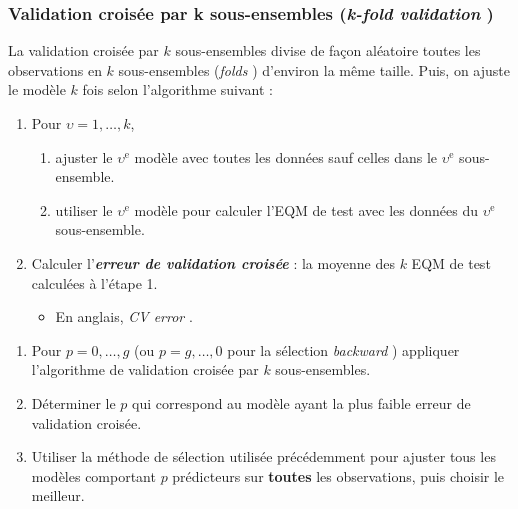 \documentclass[french]{article}
\begin{document}
\begin{multicols*}{2}
\subsubsection{Validation croisée par k sous-ensembles (\og \textit{k-fold validation} \fg{})}
\begin{algo2}
La validation croisée par $k$ sous-ensembles divise de façon aléatoire toutes les observations en $k$ sous-ensembles (\og \textit{folds} \fg{}) d'environ la même taille. Puis, on ajuste le modèle $k$ fois selon l'algorithme suivant : 
\begin{enumerate}[label = \circled{\arabic*}{trueblue}]
	\item	Pour $\upsilon = 1, \dots, k$, 
		\begin{enumerate}[label = \circled{\scriptsize{(\alph*)}}{trueblue!80!white}]
		\item	ajuster le $\upsilon^{\text{e}}$ modèle avec toutes les données sauf celles dans le $\upsilon^{\text{e}}$ sous-ensemble.
		\item	utiliser le $\upsilon^{\text{e}}$ modèle pour calculer l'EQM de test avec les données du $\upsilon^{\text{e}}$ sous-ensemble.
		\end{enumerate}
	\item	Calculer l'\textbf{\textit{erreur de validation croisée}} : la moyenne des $k$ EQM de test calculées à l'étape 1.
		\begin{itemize}
		\item	En anglais, \og \textit{CV error} \fg{}.
		\end{itemize}
\end{enumerate}
\end{algo2}

\begin{algo2}
\begin{enumerate}[label = \circled{\arabic*}{trueblue}]
	\item	Pour $p = 0, \dots, g$ (ou $p = g, \dots, 0$ pour la sélection \og \textit{backward} \fg{}) appliquer l'algorithme de validation croisée par $k$ sous-ensembles.
	\item	Déterminer le $p$ qui correspond au modèle ayant la plus faible erreur de validation croisée.
	\item	Utiliser la méthode de sélection utilisée précédemment pour ajuster tous les modèles comportant $p$ prédicteurs sur \textbf{toutes} les observations, puis choisir le meilleur.
\end{enumerate}
\end{algo2}


\end{multicols*}
\end{document}
